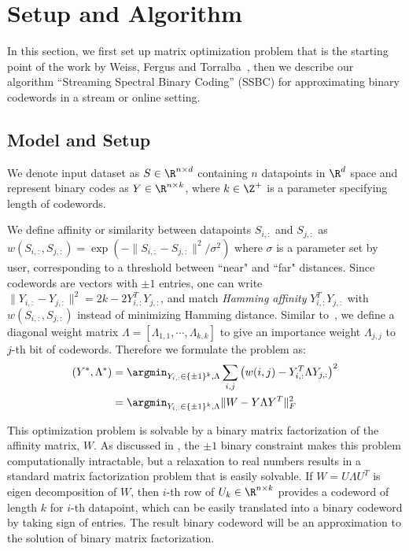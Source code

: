 \documentclass{sig-alternate}
\begin{document}
\section{Setup and Algorithm}\label{sec:algorithm}
In this section, we first set up matrix optimization problem that is the starting point of the work by Weiss, Fergus and Torralba~\cite{weiss2012multidimensional}, then we describe our algorithm ``Streaming Spectral Binary Coding'' (SSBC) for approximating binary codewords in a stream or online setting.
\subsection{Model and Setup}\label{sec:model}  
We denote input dataset as $S \in \R^{n \times d}$ containing $n$ datapoints in $\R^d$ space and represent binary codes as $Y \in \R^{n \times k}$, where $k \in \Z^+$ is a parameter specifying length of codewords.

We define affinity or similarity between datapoints $S_{i,:}$ and $S_{j,:}$ as $w(S_{i,:},S_{j,:}) = \exp(-\|S_{i,:} - S_{j,:}\|^2/\sigma^2)$ where $\sigma$ is a parameter set by user,  corresponding to a threshold between ``near" and ``far" distances.
Since codewords are vectors with $\pm1$ entries, one can write $\|Y_{i,:} - Y_{j,:}\|^2 = 2k - 2Y_{i,:}^TY_{j,:}$, and match \textit{Hamming affinity} $Y_{i,:}^TY_{j,:}$ with $w(S_{i,:},S_{j,:})$  instead of minimizing Hamming distance. 
Similar to~\cite{weiss2012multidimensional}, we define a diagonal weight matrix $\Lambda = [\Lambda_{1,1},\cdots,\Lambda_{k,k}]$ to give an importance weight $\Lambda_{j,j}$ to $j$-th bit of codewords.
Therefore we formulate the problem as:
\begin{align*}
(Y^*, \Lambda^*) &= \argmin_{Y_{i,:} \in \{\pm1\}^k,\Lambda} \sum_{i,j} \left(w(i,j) - Y_{i,:}^T \Lambda Y_{j,:}\right)^2 \\
&= \argmin_{Y_{i,:} \in \{\pm1\}^k,\Lambda} \|W - Y\Lambda Y^T\|_F^2
\end{align*}

This optimization problem is solvable by a binary matrix factorization of the affinity matrix, $W$. As discussed in \cite{srebro2003weighted,weiss2012multidimensional}, the $\pm1$ binary constraint makes this problem computationally intractable, but a relaxation to real numbers results in a standard matrix factorization problem that is easily solvable. 
If $W = U \Lambda U^T$ is eigen decomposition of $W$, then $i$-th row of $U_{k} \in \R^{n \times k}$ provides a codeword of length $k$ for $i$-th datapoint, which can be easily translated into a binary codeword by taking sign of entries.
The result binary codeword will be an approximation to the solution of binary matrix factorization. 
\end{document}
